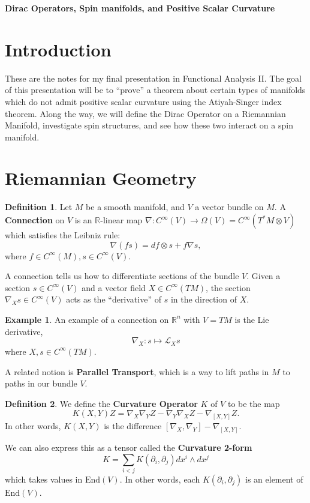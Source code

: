 \documentclass[11pt, reqno]{article}
\theoremstyle{plain}
\theoremstyle{definition}
\newtheorem*{definition}{Definition}
\newtheorem*{example}{Example}
\theoremstyle{remark}
\newcommand{\RR}{\mathbb{R}}
\begin{document}
\topmargin=-40pt
\renewcommand{\headrulewidth}{1pt}
\renewcommand{\headsep}{20pt}
\thispagestyle{fancy}

{\Large \bfseries \noindent Dirac Operators, Spin manifolds, and Positive Scalar Curvature}

\tableofcontents

\section{Introduction}

These are the notes for my final presentation in Functional Analysis II. The goal of this presentation will 
be to ``prove'' a theorem about certain types of manifolds which do not admit positive scalar curvature 
using the Atiyah-Singer index theorem. Along the way, we will define the Dirac Operator on a Riemannian Manifold,
investigate spin structures, and see how these two interact on a spin manifold. 

\section{Riemannian Geometry}

\begin{definition}
    Let $M$ be a smooth manifold, and $V$ a vector bundle on $M$. 
    A \textbf{Connection} on $V$ is an $\RR$-linear map $\nabla: C^\infty(V) \to \Omega(V) = C^\infty(T^*M \otimes V)$ which
    satisfies the Leibniz rule:
    \[
        \nabla(fs) = df \otimes s + f\nabla s,
    \]
    where $f \in C^\infty(M), s \in C^\infty(V)$.

    A connection tells us how to differentiate sections of the bundle $V$. Given a section $s \in C^\infty(V)$ and a 
    vector field $X \in C^\infty(TM)$, the section $\nabla_X s \in C^\infty(V)$ acts as the ``derivative''
    of $s$ in the direction of $X$. 
\end{definition}

\begin{example}
    An example of a connection on $\RR^n$ with $V = TM$ is the Lie derivative,
    \[
        \nabla_X: s \mapsto \mathcal{L}_X s
    \]
    where $X, s \in C^\infty(TM)$.
\end{example}

A related notion is \textbf{Parallel Transport}, which is a way to lift paths in $M$ to paths in 
our bundle $V$. 

\begin{definition}
    We define the \textbf{Curvature Operator} $K$ of $V$ to be the map
    \[
        K(X, Y)Z = \nabla_X \nabla_Y Z - \nabla_Y \nabla_X Z - \nabla_{[X,Y]}Z.
    \]
    In other words, $K(X,Y)$ is the difference $[\nabla_X, \nabla_Y] - \nabla_{[X, Y]}$.

    We can also express this as a tensor called the \textbf{Curvature 2-form} 
    \[
        K = \sum_{i < j} K(\partial_i, \partial_j)dx^i \wedge dx^j
    \]
    which takes values in $\text{End}(V)$. In other words, each $K(\partial_i, \partial_j)$ is an element
    of $\text{End}(V)$. 
\end{definition}
\end{document}
